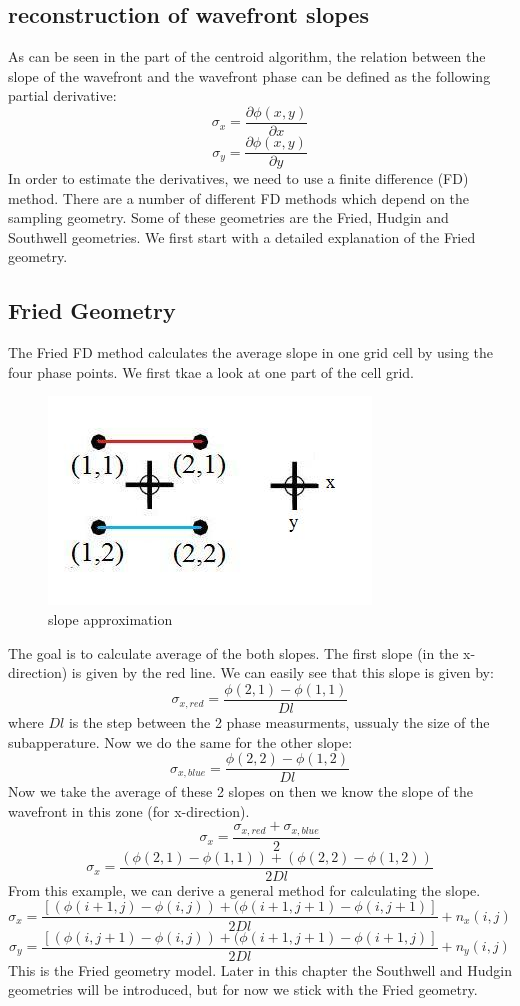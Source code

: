 \documentclass{article}
\begin{document}
\subsection{reconstruction of wavefront slopes}
As can be seen in the part of the centroid algorithm, the relation between the slope of the wavefront and the wavefront phase can be defined as the following partial derivative:
$$ \sigma_x = \frac{\partial\phi(x,y)}{\partial x}$$ 
$$ \sigma_y = \frac{\partial\phi(x,y)}{\partial y}$$ 
In order to estimate the derivatives, we need to use a finite difference (FD) method. There are a number of different FD methods which depend on the sampling geometry. Some of these geometries are the Fried, Hudgin and Southwell geometries. We first start with a detailed explanation of the Fried geometry.

\subsection{Fried Geometry}
The Fried FD method calculates the average slope in one grid cell by using the four phase points. We first tkae a look at one part of the cell grid.
\begin{figure}[h!]
  \centering
  \includegraphics[scale=0.6]{figures/fried}
  \caption{slope approximation}
\end{figure}
\newpage
\noindent The goal is to calculate average of the both slopes. The first slope (in the x-direction) is given by the red line. We can easily see that this slope is given by:
$$ \sigma_{x,red} = \frac{\phi(2,1) - \phi(1,1)}{Dl} $$
where $Dl$ is the step between the 2 phase measurments, ussualy the size of the subapperature.
Now we do the same for the other slope:
$$ \sigma_{x,blue} = \frac{\phi(2,2) - \phi(1,2)}{Dl} $$
Now we take the average of these 2 slopes on then we know the slope of the wavefront in this zone (for x-direction).
$$ \sigma_x = \frac{\sigma_{x,red}+\sigma_{x,blue}}{2}$$
$$ \sigma_x = \frac{(\phi(2,1) - \phi(1,1))+(\phi(2,2) - \phi(1,2))}{2Dl}$$
From this example, we can derive a general method for calculating the slope. 
$$ \sigma_x = \frac{[(\phi(i+1,j)-\phi(i,j))+(\phi(i+1,j+1)-\phi(i,j+1)]}{2Dl} + n_x(i,j)$$
$$ \sigma_y = \frac{[(\phi(i,j+1)-\phi(i,j))+(\phi(i+1,j+1)-\phi(i+1,j)]}{2Dl} + n_y(i,j)$$
This is the Fried geometry model. Later in this chapter the Southwell and Hudgin geometries will be introduced, but for now we stick with the Fried geometry.  
\end{document}
